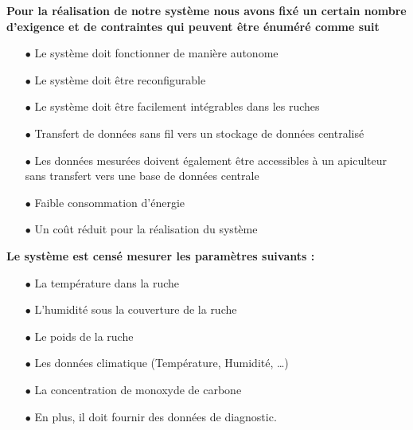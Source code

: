 \documentclass[a4paper,12pt]{report}
\begin{document}
	\textbf{Pour la réalisation de notre système nous avons fixé un certain nombre d’exigence et de contraintes qui peuvent être énuméré comme suit }
	
	\begin{itemize}
		\item [$\bullet$] Le système doit fonctionner de manière autonome  
		\item [$\bullet$] Le système doit être reconfigurable 
		\item [$\bullet$]Le système doit être facilement intégrables dans les ruches 
		\item [$\bullet$]Transfert de données sans fil vers un stockage de données centralisé 
		\item [$\bullet$] Les données mesurées doivent également être accessibles à un apiculteur sans transfert vers une base de données centrale 
		\item [$\bullet$] Faible consommation d'énergie 
		
		\item [$\bullet$]Un coût réduit pour la réalisation du système
	\end{itemize}
	\textbf{Le système est censé mesurer les paramètres suivants :}
	\begin{itemize}
		\item  [$\bullet$] La température dans la ruche 
		\item [$\bullet$] L’humidité sous la couverture de la ruche 
		\item [$\bullet$] Le poids de la ruche 
		\item [$\bullet$] Les données climatique (Température, Humidité, …) 
		\item [$\bullet$] La concentration de monoxyde de carbone 
		\item [$\bullet$] En plus, il doit fournir des données de diagnostic.
	\end{itemize}
	
	
	
	
	
	
	
	
	
	
	
	
	
	
	
	
	
\end{document}
